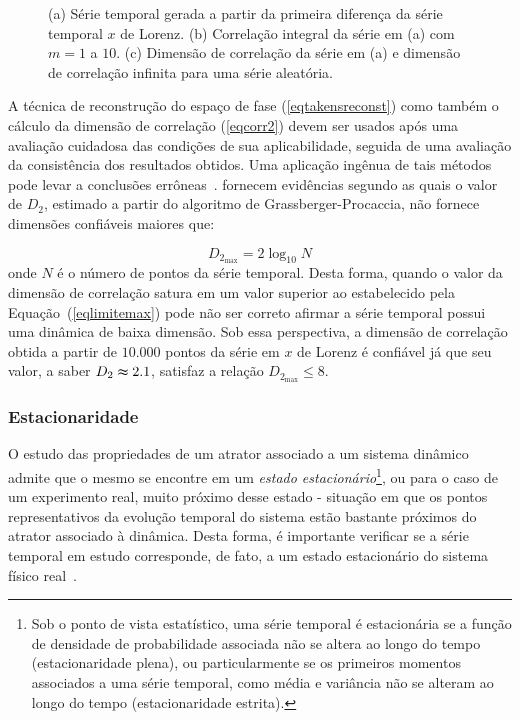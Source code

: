 \begin{figure}[ht]
\caption{(a) Série temporal gerada a partir da primeira diferença da série temporal $x$ de Lorenz. (b) Correlação integral da série em (a) com $m=1$ a $10$. (c) Dimensão de correlação da série em (a) e dimensão de correlação infinita para uma série aleatória.}
\label{figlorenzdiff}
\end{figure}

A técnica de reconstrução do espaço de fase (\ref{eqtakensreconst}) como também o cálculo da dimensão de correlação (\ref{eqcorr2}) devem ser usados após uma avaliação cuidadosa das condições de sua aplicabilidade, seguida de uma avaliação da consistência dos resultados obtidos. Uma aplicação ingênua de tais métodos pode levar a conclusões errôneas~\cite{osboproven/89}.  fornecem evidências segundo as quais o valor de $D_{2}$, estimado a partir do algoritmo de Grassberger-Procaccia, não fornece dimensões confiáveis maiores que:

\begin{equation}
D_{2_{\textrm{max}}}=2\log_{10}N
\label{eqlimitemax}
\end{equation}
onde $N$ é o número de pontos da série temporal. Desta forma, quando o valor da dimensão de correlação satura em um valor superior ao estabelecido pela Equação~(\ref{eqlimitemax}) pode não ser correto afirmar a série temporal possui uma dinâmica de baixa dimensão. Sob essa perspectiva, a dimensão de correlação obtida a partir de $10.000$ pontos da série em $x$ de Lorenz é confiável já que seu valor, a saber $D_{2}\thickapprox 2.1$, satisfaz a relação $D_{2_{\textrm{max}}}\leq 8$.

\subsubsection{Estacionaridade}
\label{subsecestacio}

O estudo das propriedades de um atrator associado a um sistema dinâmico 
admite que o mesmo se encontre em um \textit{estado estacionário}\footnote{Sob o ponto de vista estatístico, uma série temporal é estacionária se a função de densidade de probabilidade associada não se altera ao longo do tempo (estacionaridade plena), ou particularmente se os primeiros momentos associados a uma série temporal, como média e variância não se alteram ao longo do tempo (estacionaridade estrita).}, ou para o caso de um experimento real, muito próximo desse estado - situação em que os pontos representativos da evolução temporal do sistema estão bastante próximos do atrator associado à dinâmica. Desta forma, é importante verificar se a série temporal em estudo corresponde, de fato, a um estado estacionário do sistema físico real~\cite{aguirre/00}.

